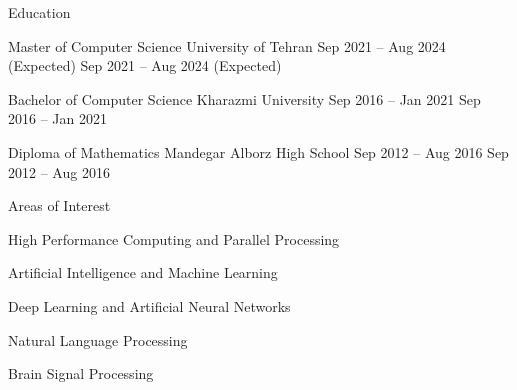 \documentclass[]{main}
\begin{document}
\resumeheader
{}
{}
{}
{}
{}
{}

\begin{section}{Education}
    \begin{subsectionnobullet}{ Master of Computer Science }{ University of Tehran }{ Sep 2021 -- Aug 2024 (Expected) }{ Sep 2021 -- Aug 2024 (Expected) }
        \end{subsectionnobullet}
    \begin{subsectionnobullet}{ Bachelor of Computer Science }{ Kharazmi University }{ Sep 2016 -- Jan 2021 }{ Sep 2016 -- Jan 2021 }
        \end{subsectionnobullet}
    \begin{subsectionnobullet}{ Diploma of Mathematics }{ Mandegar Alborz High School }{ Sep 2012 -- Aug 2016 }{ Sep 2012 -- Aug 2016 }
        \end{subsectionnobullet}
    \end{section}

\begin{section}{Areas of Interest}
    \begin{subsectionbullet}
        \item High Performance Computing and Parallel Processing
        \item Artificial Intelligence and Machine Learning
        \item Deep Learning and Artificial Neural Networks
        \item Natural Language Processing
        \item Brain Signal Processing
        \end{subsectionbullet}
\end{section}
\end{document}

